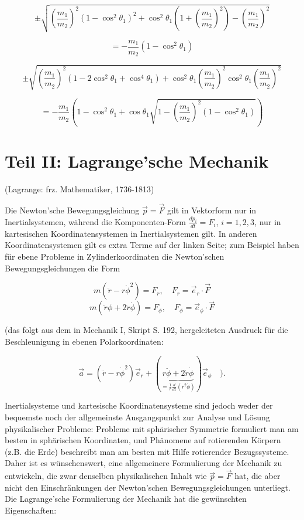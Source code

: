 \documentclass[10pt, letterpaper]{article}
\begin{document}
\[\pm \sqrt{\left(\frac{m_1}{m_2}\right)^2(1-\cos^2\theta_1)^2 + \cos^2\theta_1\left(1+\left(\frac{m_1}{m_2}\right)^2\right)-\left(\frac{m_1}{m_2}\right)^2}\]

\[= -\frac{m_1}{m_2}(1-\cos^2\theta_1)\]

\[\pm \sqrt{\left(\frac{m_1}{m_2}\right)^2(1-2\cos^2\theta_1+\cos^4\theta_1) + \cos^2\theta_1\left(\frac{m_1}{m_2}\right)^2\cos^2\theta_1\left(\frac{m_1}{m_2}\right)^2}\]

\[= -\frac{m_1}{m_2}(1-\cos^2\theta_1 + \cos\theta_1\sqrt{1-\left(\frac{m_1}{m_2}\right)^2(1-\cos^2\theta_1)})\]



\pagebreak



\section{Teil II: Lagrange'sche Mechanik}
\vspace{0.3cm}
\noindent (Lagrange: frz. Mathematiker, 1736-1813)

Die Newton'sche Bewegungsgleichung $\vec{p} = \vec{F}$ gilt in Vektorform nur in Inertialsystemen, während die Komponenten-Form $\frac{dp_i}{dt} = F_i$, $i=1,2,3$, nur in kartesischen Koordinatensystemen in Inertialsystemen gilt. In anderen Koordinatensystemen gilt es extra Terme auf der linken Seite; zum Beispiel haben für ebene Probleme in Zylinderkoordinaten die Newton'schen Bewegungsgleichungen die Form

\[m(\ddot{r}-r\dot{\phi}^2) = F_r, \quad F_r = \vec{e}_r \cdot \vec{F}\]
\[m(\ddot{r}\phi + 2\dot{r}\dot{\phi}) = F_{\phi}, \quad F_{\phi} = \vec{e}_{\phi} \cdot \vec{F}\]

(das folgt aus dem in Mechanik I, Skript S. 192, hergeleiteten Ausdruck für die Beschleunigung in ebenen Polarkoordinaten:

\[\vec{a} = (\ddot{r}-r\dot{\phi}^2)\vec{e}_r + (\underbrace{r\ddot{\phi} + 2\dot{r}\dot{\phi}}_{=\frac{1}{r}\frac{d}{dt}(r^2\dot{\phi})})\vec{e}_{\phi} \quad).\]

Inertialsysteme und kartesische Koordinatensysteme sind jedoch weder der bequemste noch der allgemeinste Ausgangspunkt zur Analyse und Lösung physikalischer Probleme: Probleme mit sphärischer Symmetrie formuliert man am besten in sphärischen Koordinaten, und Phänomene auf rotierenden Körpern (z.B. die Erde) beschreibt man am besten mit Hilfe rotierender Bezugssysteme. Daher ist es wünschenswert, eine allgemeinere Formulierung der Mechanik zu entwickeln, die zwar denselben physikalischen Inhalt wie $\vec{p}=\vec{F}$ hat, die aber nicht den Einschränkungen der Newton'schen Bewegungsgleichungen unterliegt. Die Lagrange'sche Formulierung der Mechanik hat die gewünschten Eigenschaften:
\end{document}
